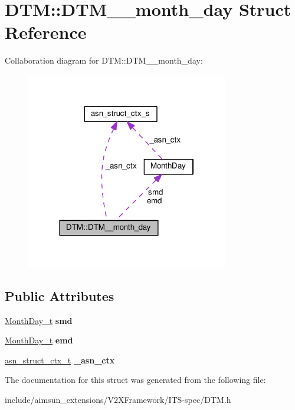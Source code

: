 \hypertarget{structDTM_1_1DTM____month__day}{}\section{D\+TM\+:\+:D\+T\+M\+\_\+\+\_\+month\+\_\+day Struct Reference}
\label{structDTM_1_1DTM____month__day}


Collaboration diagram for D\+TM\+:\+:D\+T\+M\+\_\+\+\_\+month\+\_\+day\+:\nopagebreak
\begin{figure}[H]
\begin{center}
\leavevmode
\includegraphics[width=250pt]{structDTM_1_1DTM____month__day__coll__graph}
\end{center}
\end{figure}
\subsection*{Public Attributes}
\begin{DoxyCompactItemize}
\item 
\hyperlink{structMonthDay}{Month\+Day\+\_\+t} {\bfseries smd}\hypertarget{structDTM_1_1DTM____month__day_a89f4eabeda533ff1a5f3058e783d8f07}{}\label{structDTM_1_1DTM____month__day_a89f4eabeda533ff1a5f3058e783d8f07}

\item 
\hyperlink{structMonthDay}{Month\+Day\+\_\+t} {\bfseries emd}\hypertarget{structDTM_1_1DTM____month__day_a11e2cf87e79278d1dcbffc90b5da6af6}{}\label{structDTM_1_1DTM____month__day_a11e2cf87e79278d1dcbffc90b5da6af6}

\item 
\hyperlink{structasn__struct__ctx__s}{asn\+\_\+struct\+\_\+ctx\+\_\+t} {\bfseries \+\_\+asn\+\_\+ctx}\hypertarget{structDTM_1_1DTM____month__day_ac83f79a138e1f4f16ac332ca0d610d0c}{}\label{structDTM_1_1DTM____month__day_ac83f79a138e1f4f16ac332ca0d610d0c}

\end{DoxyCompactItemize}


The documentation for this struct was generated from the following file\+:\begin{DoxyCompactItemize}
\item 
include/aimsun\+\_\+extensions/\+V2\+X\+Framework/\+I\+T\+S-\/spec/D\+T\+M.\+h\end{DoxyCompactItemize}
